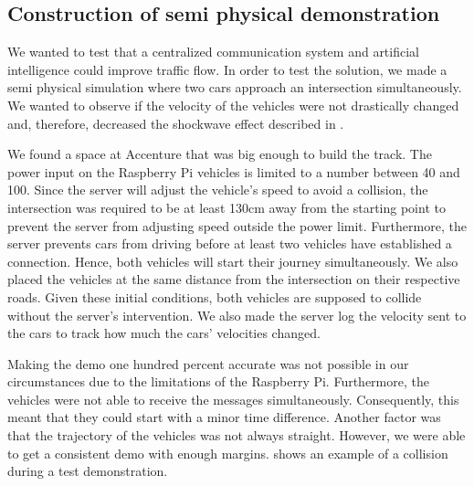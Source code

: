 \subsection{Construction of semi physical demonstration}\label{sec:demo}
We wanted to test that a centralized communication system and artificial intelligence could improve traffic flow. In order to test the solution, we made a semi physical simulation where two cars approach an intersection simultaneously. We wanted to observe if the velocity of the vehicles were not drastically changed and, therefore, decreased the shockwave effect described in .

We found a space at Accenture that was big enough to build the track. The power input on the Raspberry Pi vehicles is limited to a number between 40 and 100.  Since the server will adjust the vehicle's speed to avoid a collision, the intersection was required to be at least 130cm away from the starting point to prevent the server from adjusting speed outside the power limit. Furthermore, the server prevents cars from driving before at least two vehicles have established a connection. Hence, both vehicles will start their journey simultaneously. We also placed the vehicles at the same distance from the intersection on their respective roads. Given these initial conditions, both vehicles are supposed to collide without the server's intervention. We also made the server log the velocity sent to the cars to track how much the cars' velocities changed.

Making the demo one hundred percent accurate was not possible in our circumstances due to the limitations of the Raspberry Pi. Furthermore, the vehicles were not able to receive the messages simultaneously. Consequently, this meant that they could start with a minor time difference. Another factor was that the trajectory of the vehicles was not always straight. However, we were able to get a consistent demo with enough margins.  shows an example of a collision during a test demonstration.

